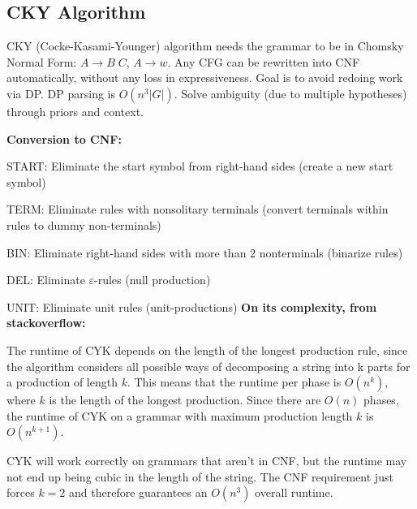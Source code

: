 \documentclass[12pt]{article}
\begin{document}
\subsection{CKY Algorithm}
\par CKY (Cocke-Kasami-Younger) algorithm needs the grammar to be in Chomsky Normal Form: $A \rightarrow B\;C$, $A \rightarrow w$. Any CFG can be rewritten into CNF automatically, without any loss in expressiveness. Goal is to avoid redoing work via DP. DP parsing is $O(n^3|G|)$. Solve ambiguity (due to multiple hypotheses) through priors and context.
\par \textbf{Conversion to CNF:}
\olb
\item START: Eliminate the start symbol from right-hand sides (create a new start symbol)
\item TERM: Eliminate rules with nonsolitary terminals (convert terminals within rules to dummy non-terminals)
\item BIN: Eliminate right-hand sides with more than 2 nonterminals (binarize rules)
\item DEL: Eliminate $\varepsilon$-rules (null production)
\item UNIT: Eliminate unit rules (unit-productions)
\ole
\textbf{On its complexity, from stackoverflow:}
\par The runtime of CYK depends on the length of the longest production rule, since the algorithm considers all possible ways of decomposing a string into k parts for a production of length $k$. This means that the runtime per phase is $O(n^k)$, where $k$ is the length of the longest production. Since there are $O(n)$ phases, the runtime of CYK on a grammar with maximum production length $k$ is $O(n^{k+1})$.
\par CYK will work correctly on grammars that aren't in CNF, but the runtime may not end up being cubic in the length of the string. The CNF requirement just forces $k = 2$ and therefore guarantees an $O(n^3)$ overall runtime.
\end{document}
